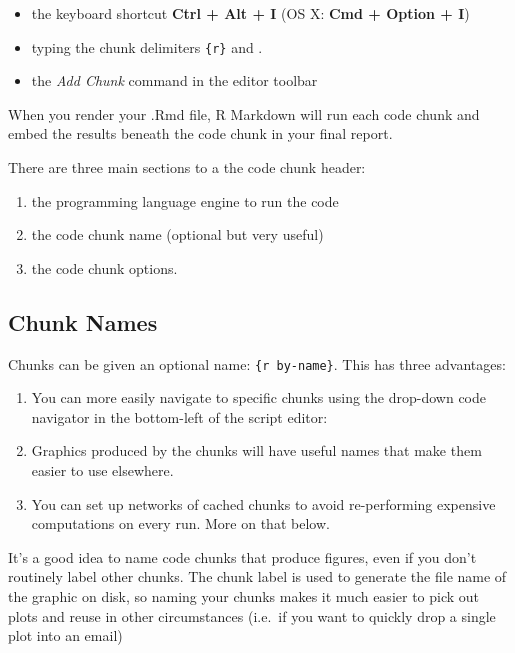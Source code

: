 \documentclass[]{book}
\providecommand{\tightlist}{%
  \setlength{\itemsep}{0pt}\setlength{\parskip}{0pt}}
\begin{document}
\begin{itemize}
\tightlist
\item
  the keyboard shortcut \textbf{Ctrl + Alt + I} (OS X: \textbf{Cmd +
  Option + I})
\item
  typing the chunk delimiters
  \texttt{\textasciigrave{}\textasciigrave{}\textasciigrave{}\{r\}} and
  \texttt{\textasciigrave{}\textasciigrave{}\textasciigrave{}}.
\item
  the \emph{Add Chunk} command in the editor toolbar
\end{itemize}

When you render your .Rmd file, R Markdown will run each code chunk and
embed the results beneath the code chunk in your final report.

There are three main sections to a the code chunk header:

\begin{enumerate}
\def\labelenumi{\arabic{enumi}.}
\tightlist
\item
  the programming language engine to run the code
\item
  the code chunk name (optional but very useful)
\item
  the code chunk options.
\end{enumerate}

\subsection{Chunk Names}\label{chunk-names}

Chunks can be given an optional name:
\texttt{\textasciigrave{}\textasciigrave{}\textasciigrave{}\{r\ by-name\}}.
This has three advantages:

\begin{enumerate}
\def\labelenumi{\arabic{enumi}.}
\tightlist
\item
  You can more easily navigate to specific chunks using the drop-down
  code navigator in the bottom-left of the script editor:
\item
  Graphics produced by the chunks will have useful names that make them
  easier to use elsewhere.
\item
  You can set up networks of cached chunks to avoid re-performing
  expensive computations on every run. More on that below.
\end{enumerate}

It's a good idea to name code chunks that produce figures, even if you
don't routinely label other chunks. The chunk label is used to generate
the file name of the graphic on disk, so naming your chunks makes it
much easier to pick out plots and reuse in other circumstances (i.e.~if
you want to quickly drop a single plot into an email)
\end{document}
